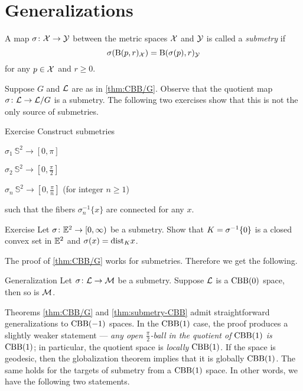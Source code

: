 \section{Generalizations}

A map $\sigma\colon\mathcal{X}\to\mathcal{Y}$ between the metric spaces $\mathcal{X}$ and $\mathcal{Y}$
is called a \emph{submetry} if 
\[\sigma(\mathrm{B}{}(p,r)_{\mathcal{X}})=\mathrm{B}{}(\sigma(p),r)_{\mathcal{Y}}\]
for any $p\in \mathcal{X}$ and $r\ge 0$.

Suppose $G$ and $\mathcal{L}$ are as in \ref{thm:CBB/G}.
Observe that the quotient map $\sigma\colon\mathcal{L}\to \mathcal{L}/G$ is a submetry.
The following two exercises show that this is not the only source of submetries. 

\begin{thm}{Exercise}\label{ex:sumbetries(S^2)}
Construct submetries
\begin{subthm}{}
$\sigma_1\:\mathbb{S}^2\to[0,\pi]$
\end{subthm}
\begin{subthm}{}
$\sigma_2\:\mathbb{S}^2\to[0,\tfrac\pi2]$
\end{subthm}
\begin{subthm}{}
$\sigma_n\:\mathbb{S}^2\to[0,\tfrac\pi n]$ (for integer $n\ge 1$)
\end{subthm}
such that the fibers $\sigma_n^{-1}\{x\}$ are connected for any $x$.
\end{thm}

\begin{thm}{Exercise}
Let $\sigma\colon\mathbb{E}^2\to [0,\infty)$ be a submetry.
Show that $K\z=\sigma^{-1}\{0\}$ is a closed convex set in $\mathbb{E}^2$ and $\sigma(x)=\mathrm{dist}_Kx$.
\end{thm}

The proof of \ref{thm:CBB/G} works for submetries.
Therefore we get the following.

\begin{thm}{Generalization}\label{thm:submetry-CBB}
Let $\sigma\colon\mathcal{L}\to\mathcal{M}$ be a submetry.
Suppose $\mathcal{L}$ is a $\mathrm{CBB}(0)$ space, then so is $\mathcal{M}$.
\end{thm}

Theorems \ref{thm:CBB/G} and \ref{thm:submetry-CBB} admit straightforward generalizations to $\mathrm{CBB}(-1)$ spaces.
In the $\mathrm{CBB}(1)$ case, the proof produces a slightly weaker statement ---  \textit{any open $\tfrac\pi2$-ball in the quotient of $\mathrm{CBB}(1)$ is $\mathrm{CBB}(1)$};
in particular, the quotient space is \textit{locally} $\mathrm{CBB}(1)$.
If the space is geodesic, then the globalization theorem implies that it is globally  $\mathrm{CBB}(1)$.
The same holds for the targets of submetry from a  $\mathrm{CBB}(1)$ space.
In other words, we have the following two statements.


